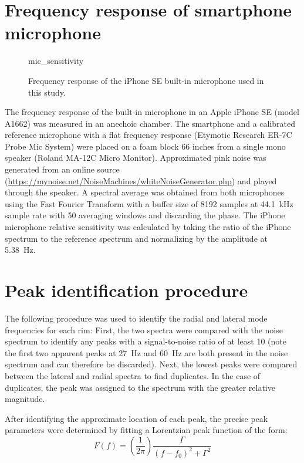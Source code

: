 \documentclass[../../thesis.tex]{subfiles}
\begin{document}
\section{Frequency response of smartphone microphone}
\label{app:mic_cal}

\begin{figure}[h]
\centering
{mic_sensitivity}
\caption{Frequency response of the iPhone SE built-in microphone used in this study.}
\label{fig:mic_sensitivity}
\end{figure}

The frequency response of the built-in microphone in an Apple iPhone SE (model A1662) was measured in an anechoic chamber. The smartphone and a calibrated reference microphone with a flat frequency response (Etymotic Research ER-7C Probe Mic System) were placed on a foam block 66 inches from a single mono speaker (Roland MA-12C Micro Monitor). Approximated pink noise was generated from an online source (\url{https://mynoise.net/NoiseMachines/whiteNoiseGenerator.php}) and played through the speaker. A spectral average was obtained from both microphones using the Fast Fourier Transform with a buffer size of 8192 samples at \SI{44.1}{kHz} sample rate with 50 averaging windows and discarding the phase. The iPhone microphone relative sensitivity was calculated by taking the ratio of the iPhone spectrum to the reference spectrum and normalizing by the amplitude at \SI{5.38}{Hz}.

\section{Peak identification procedure}
\label{app:peak_fits}

The following procedure was used to identify the radial and lateral mode frequencies for each rim: First, the two spectra were compared with the noise spectrum to identify any peaks with a signal-to-noise ratio of at least 10 (note the first two apparent peaks at \SI{27}{Hz} and \SI{60}{Hz} are both present in the noise spectrum and can therefore be discarded). Next, the lowest peaks were compared between the lateral and radial spectra to find duplicates. In the case of duplicates, the peak was assigned to the spectrum with the greater relative magnitude.

After identifying the approximate location of each peak, the precise peak parameters were determined by fitting a Lorentzian peak function of the form:
\begin{equation}
\label{eq:ema_peak_fit}
F(f) = \left(\frac{1}{2\pi}\right) \frac{\Gamma}{(f-f_0)^2 + \Gamma^2}
\end{equation}
\end{document}
